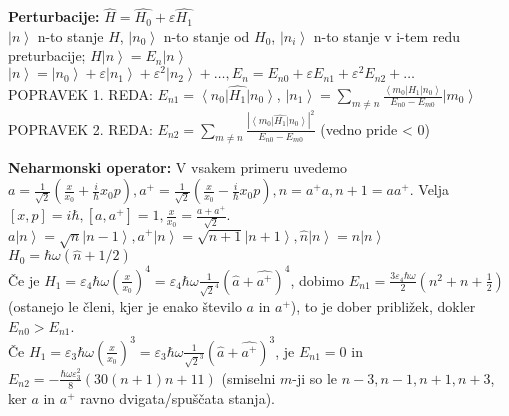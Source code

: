 \documentclass[a4paper, oneside, 12pt]{article}
\theoremstyle{definition}
\begin{document}
\textbf{Perturbacije:} $\hat{H} = \hat{H_0} + \varepsilon \hat{H_1}$\\
$\left\lvert n\right\rangle$ n-to stanje $H$, $\left\lvert n_0\right\rangle$ n-to stanje od $H_0$, $\left\lvert n_i\right\rangle$ n-to stanje v i-tem redu preturbacije; $H \left\lvert n\right\rangle = E_n \left\lvert n\right\rangle$\\
$\left\lvert n\right\rangle = \left\lvert n_0\right\rangle + \varepsilon \left\lvert n_1\right\rangle + \varepsilon^2 \left\lvert n_2\right\rangle + \ldots, E_n = E_{n0} + \varepsilon E_{n1} + \varepsilon^2 E_{n2} + \ldots$\\
POPRAVEK 1. REDA: $E_{n1} = \left\langle n_0\right\lvert \hat{H_1}\left\lvert n_0\right\rangle$, $\left\lvert n_1\right\rangle = \sum_{m \neq n} \frac{\left\langle m_0 \right\lvert  \hat{H_1}\left\lvert n_0\right\rangle}{E_{n0} - E_{m0}} \left\lvert m_0\right\rangle$\\
POPRAVEK 2. REDA: $E_{n2} = \sum_{m \neq n} \frac{|\left\langle m_0 \right\rvert  \hat{H_1}\left\lvert n_0\right\rangle|^2}{E_{n0} - E_{m0}}$ (vedno pride < 0)

\textbf{Neharmonski operator:} V vsakem primeru uvedemo $a = \frac{1}{\sqrt{2}} (\frac{x}{x_0} + \frac{i}{\hbar} x_0 p), a^+ = \frac{1}{\sqrt{2}} (\frac{x}{x_0} - \frac{i}{\hbar} x_0 p), n = a^+a, n+1 = a a^+$. Velja $[x,p] = i\hbar, [a, a^+] = 1, \frac{x}{x_0} = \frac{a + a^+}{\sqrt{2}}$.\\
$a \left\lvert n\right\rangle = \sqrt{n} \left\lvert n-1\right\rangle, a^+ \left\lvert n\right\rangle = \sqrt{n+1} \left\lvert n+1\right\rangle, \hat{n} \left\lvert n\right\rangle = n \left\lvert n\right\rangle$\\
$H_0 = \hbar \omega (\hat{n} + 1/2)$\\
Če je $H_1 = \varepsilon_4 \hbar \omega (\frac{x}{x_0})^4 = \varepsilon_4 \hbar \omega \frac{1}{\sqrt{2}^4} (\hat{a} + \hat{a^+})^4$, dobimo $E_{n1} = \frac{3 \varepsilon_4 \hbar \omega}{2} (n^2 + n + \frac{1}{2})$ (ostanejo le členi, kjer je enako število $a$ in $a^+$), to je dober približek, dokler $E_{n0} > E_{n1}$.\\
Če $H_1 = \varepsilon_3 \hbar \omega (\frac{x}{x_0})^3= \varepsilon_3 \hbar \omega \frac{1}{\sqrt{2}^3} (\hat{a} + \hat{a^+})^3$, je $E_{n1} = 0$ in $E_{n2} = - \frac{\hbar \omega \varepsilon_3^2}{8} (30 (n+1)n + 11)$ (smiselni $m$-ji so le $n-3, n-1, n+1, n+3$, ker $a$ in $a^+$ ravno dvigata/spuščata stanja).
\end{document}
